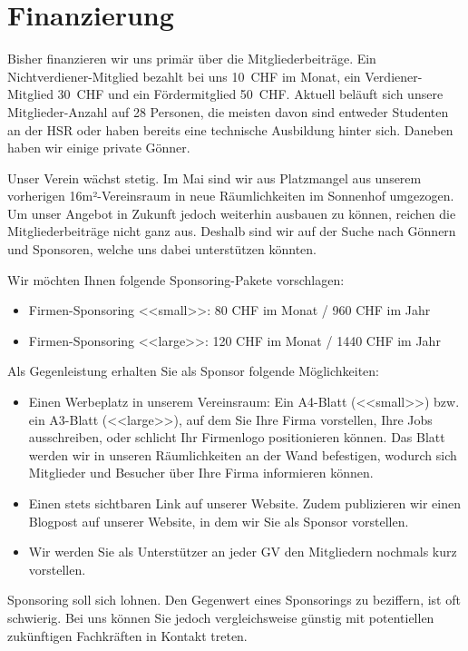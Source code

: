 \documentclass[10pt,a4paper,parskip,fleqn]{scrartcl}
\newcommand{\membercount}{28}
\begin{document}
\section{Finanzierung}

Bisher finanzieren wir uns primär über die Mitgliederbeiträge. Ein
Nichtverdiener-Mitglied bezahlt bei uns 10~CHF im Monat, ein Verdiener-Mitglied
30~CHF und ein Fördermitglied 50~CHF. Aktuell beläuft sich unsere
Mitglieder-Anzahl auf \membercount{} Personen, die meisten davon sind entweder
Studenten an der HSR oder haben bereits eine technische Ausbildung hinter sich.
Daneben haben wir einige private Gönner.

Unser Verein wächst stetig. Im Mai sind wir aus Platzmangel aus unserem
vorherigen 16m²-Vereinsraum in neue Räumlichkeiten im Sonnenhof umgezogen. Um
unser Angebot in Zukunft jedoch weiterhin ausbauen zu können, reichen die
Mitgliederbeiträge nicht ganz aus. Deshalb sind wir auf der Suche nach Gönnern
und Sponsoren, welche uns dabei unterstützen könnten.

Wir möchten Ihnen folgende Sponsoring-Pakete vorschlagen:

\begin{itemize}
	\item Firmen-Sponsoring <<small>>: 80 CHF im Monat / 960 CHF im Jahr	
	\item Firmen-Sponsoring <<large>>: 120 CHF im Monat / 1440 CHF im Jahr	
\end{itemize}

Als Gegenleistung erhalten Sie als Sponsor folgende Möglichkeiten:

\begin{itemize}
	\item Einen Werbeplatz in unserem Vereinsraum: Ein A4-Blatt (<<small>>) bzw.
		ein A3-Blatt (<<large>>), auf dem Sie Ihre Firma vorstellen, Ihre Jobs
		ausschreiben, oder schlicht Ihr Firmenlogo positionieren können. Das Blatt
		werden wir in unseren Räumlichkeiten an der Wand befestigen, wodurch sich
		Mitglieder und Besucher über Ihre Firma informieren können.
	\item Einen stets sichtbaren Link auf unserer Website. Zudem publizieren wir
		einen Blogpost auf unserer Website, in dem wir Sie als Sponsor vorstellen.
	\item Wir werden Sie als Unterstützer an jeder GV den Mitgliedern nochmals
		kurz vorstellen.
\end{itemize}

Sponsoring soll sich lohnen. Den Gegenwert eines Sponsorings zu beziffern, ist
oft schwierig. Bei uns können Sie jedoch vergleichsweise günstig mit
potentiellen zukünftigen Fachkräften in Kontakt treten.
\end{document}
